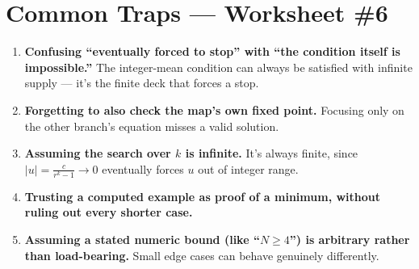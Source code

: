 \documentclass[11pt,a4paper]{article}
\begin{document}
\section*{Common Traps --- Worksheet \#6}
\begin{enumerate}[leftmargin=2em,itemsep=4pt]
  \item \textbf{Confusing ``eventually forced to stop'' with ``the condition itself is impossible.''} The integer-mean condition can always be satisfied with infinite supply --- it's the finite deck that forces a stop. 
  \item \textbf{Forgetting to also check the map's own fixed point.} Focusing only on the other branch's equation misses a valid solution. 
  \item \textbf{Assuming the search over $k$ is infinite.} It's always finite, since $|u|=\frac c{r^k-1}\to0$ eventually forces $u$ out of integer range. 
  \item \textbf{Trusting a computed example as proof of a minimum, without ruling out every shorter case.} 
  \item \textbf{Assuming a stated numeric bound (like ``$N\geq4$'') is arbitrary rather than load-bearing.} Small edge cases can behave genuinely differently. 
\end{enumerate}

\end{document}
